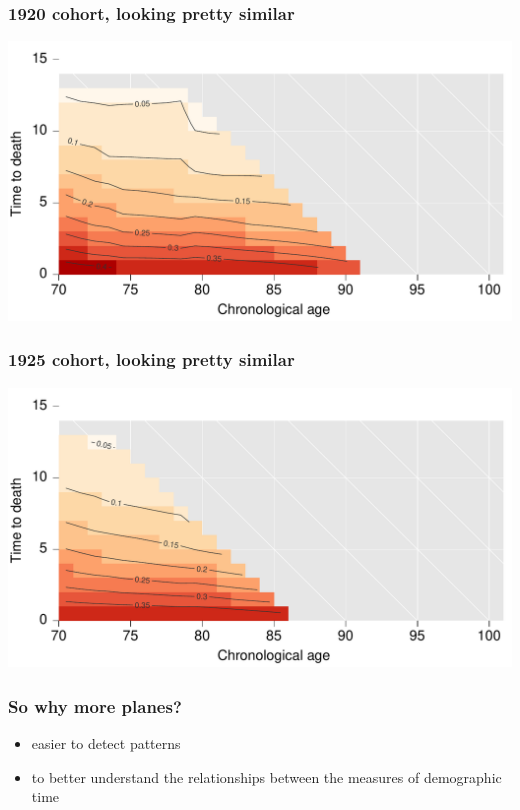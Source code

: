 \documentclass[20pt]{beamer}
\begin{document}
\begin{frame}
\frametitle{1920 cohort, looking pretty similar}
\vspace{-4em}
\begin{center}
\includegraphics[scale=1]{Figures/srhpoor1920.pdf}
\end{center}
\end{frame}


\begin{frame}
\frametitle{1925 cohort, looking pretty similar}
\vspace{-4em}
\begin{center}
\includegraphics[scale=1]{Figures/srhpoor1925.pdf}
\end{center}
\end{frame}


\begin{frame}
\frametitle{So why more planes?}
\normalsize
\begin{itemize}[<+->]
  \item easier to detect patterns
  \item to better understand the relationships between the measures of
  demographic time
\end{itemize}
\end{frame}
\end{document}
